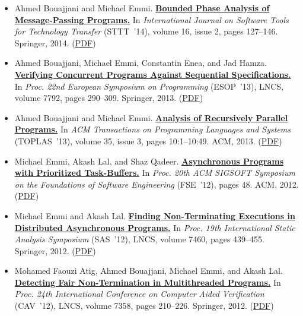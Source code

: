 \documentclass{article}
\begin{document}
\begin{itemize}[leftmargin=0cm,label={}]
    \item Ahmed Bouajjani and Michael Emmi. {\bf\href{%
    http://dx.doi.org/10.1007/s10009-013-0276-z}{%
    Bounded Phase Analysis of Message-Passing Programs.}} In \emph{ International Journal on Software Tools for Technology Transfer } (STTT ’14), volume 16, issue 2, pages 127–146. Springer, 2014. (\href{https://michael-emmi.github.io/https://github.com/michael-emmi/research-papers/raw/master/journals-sttt-BouajjaniE14.pdf}{PDF})


    \item Ahmed Bouajjani, Michael Emmi, Constantin Enea, and Jad Hamza. {\bf\href{%
    http://dx.doi.org/10.1007/978-3-642-37036-6_17}{%
    Verifying Concurrent Programs Against Sequential Specifications.}} In \emph{ Proc. 22nd European Symposium on Programming } (ESOP ’13), LNCS, volume 7792, pages 290–309. Springer, 2013. (\href{https://michael-emmi.github.io/https://github.com/michael-emmi/research-papers/raw/master/conf-esop-BouajjaniEEH13.pdf}{PDF})


    \item Ahmed Bouajjani and Michael Emmi. {\bf\href{%
    http://doi.acm.org/10.1145/2518188}{%
    Analysis of Recursively Parallel Programs.}} In \emph{ ACM Transactions on Programming Languages and Systems } (TOPLAS ’13), volume 35, issue 3, pages 10:1–10:49. ACM, 2013. (\href{https://michael-emmi.github.io/https://github.com/michael-emmi/research-papers/raw/master/journals-toplas-BouajjaniE13.pdf}{PDF})


    \item Michael Emmi, Akash Lal, and Shaz Qadeer. {\bf\href{%
    http://doi.acm.org/10.1145/2393596.2393652}{%
    Asynchronous Programs with Prioritized Task-Buffers.}} In \emph{ Proc. 20th ACM SIGSOFT Symposium on the Foundations of Software Engineering } (FSE ’12), pages 48. ACM, 2012. (\href{https://michael-emmi.github.io/https://github.com/michael-emmi/research-papers/raw/master/conf-fse-EmmiLQ12.pdf}{PDF})


    \item Michael Emmi and Akash Lal. {\bf\href{%
    http://dx.doi.org/10.1007/978-3-642-33125-1_29}{%
    Finding Non-Terminating Executions in Distributed Asynchronous Programs.}} In \emph{ Proc. 19th International Static Analysis Symposium } (SAS ’12), LNCS, volume 7460, pages 439–455. Springer, 2012. (\href{https://michael-emmi.github.io/https://github.com/michael-emmi/research-papers/raw/master/conf-sas-EmmiL12.pdf}{PDF})


    \item Mohamed Faouzi Atig, Ahmed Bouajjani, Michael Emmi, and Akash Lal. {\bf\href{%
    http://dx.doi.org/10.1007/978-3-642-31424-7_19}{%
    Detecting Fair Non-Termination in Multithreaded Programs.}} In \emph{ Proc. 24th International Conference on Computer Aided Verification } (CAV ’12), LNCS, volume 7358, pages 210–226. Springer, 2012. (\href{https://michael-emmi.github.io/https://github.com/michael-emmi/research-papers/raw/master/conf-cav-AtigBEL12.pdf}{PDF})



\end{itemize}
\end{document}
